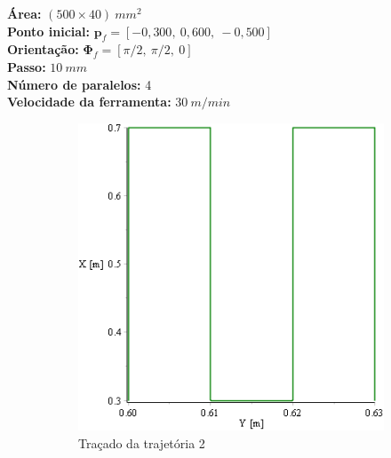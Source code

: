 %
\begin{tcolorbox}
[colframe=black!75!white, colback=white, title = Tarefa 2 -- Plano yz]
  \textbf{Área:} $(500 \times 40)~mm^2$ \\
  \textbf{Ponto inicial:} $\mathbf{p}_f = [-0,300,~0,600,~-0,500]$ \\
  \textbf{Orientação:} $\boldsymbol{\Phi}_{f} = [\pi/2,~\pi/2,~0]$ \\
  \textbf{Passo:} $10~mm$ \\
  \textbf{Número de paralelos:} 4 \\
  \textbf{Velocidade da ferramenta:} $30~m/min$
\end{tcolorbox}
%
\begin{figure}[h!]
    \centering
    \begin{subfigure}[b]{0.50\textwidth}
        \includegraphics[width=\textwidth]{figs/traj2}
        \caption{Traçado da trajetória 2}
        \label{fig::traj2}
    \end{subfigure}
    \quad %
    \begin{subfigure}[b]{0.45\textwidth}

\end{subfigure}
\end{figure}
